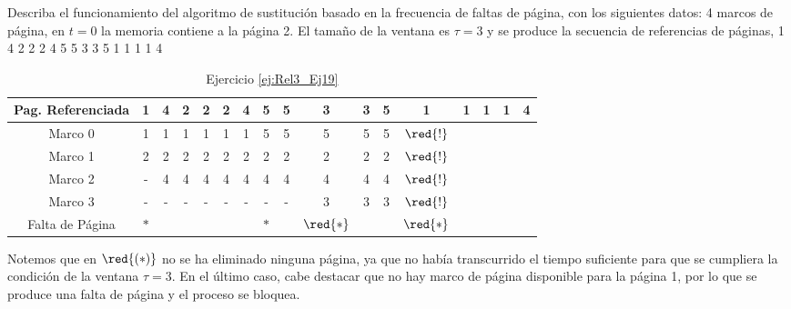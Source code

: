 \begin{ejercicio} \label{ej:Rel3_Ej19}
    Describa el funcionamiento del algoritmo de sustitución basado en la frecuencia de
faltas de página, con los siguientes datos: 4 marcos de página, en $t = 0$ la memoria
contiene a la página 2. El tamaño de la ventana es $\tau= 3$ y se produce la secuencia de
referencias de páginas, 1 4 2 2 2 4 5 5 3 3 5 1 1 1 1 4

    \begin{table}[H]
        \centering
        \begin{tabular}{|c|c|c|c|c|c|c|c|c|c|c|c|c|c|c|c|c|}
        Pag. Referenciada & 1 & 4 & 2 & 2 & 2 & 4 & 5 & 5 & 3 & 3 & 5 & 1 & 1 & 1 & 1 & 4 \\ \hline \hline
        Marco 0           & 1 & 1 & 1 & 1 & 1 & 1 & 5 & 5 & 5 & 5 & 5 & $\red{!}$ \\ \hline
        Marco 1           & 2 & 2 & 2 & 2 & 2 & 2 & 2 & 2 & 2 & 2 & 2 & $\red{!}$  \\ \hline
        Marco 2           & - & 4 & 4 & 4 & 4 & 4 & 4 & 4 & 4 & 4 & 4 & $\red{!}$  \\ \hline
        Marco 3           & - & - & - & - & - & - & - & - & 3 & 3 & 3 & $\red{!}$\\ \hline \hline
        Falta de Página   & $\ast$ &   &   &   &   &   & $\ast$ &   & $\red{\ast}$ &   &   & $\red{\ast}$
        \end{tabular}
        \caption{Ejercicio \ref{ej:Rel3_Ej19}}
        \label{tab:Rel3_Ej19}
    \end{table}

    Notemos que en $\red{(\ast)}$ no se ha eliminado ninguna página, ya que no había transcurrido el tiempo suficiente
    para que se cumpliera la condición de la ventana $\tau=3$. En el último caso,
    cabe destacar que no hay marco de página disponible para la página 1, por lo que se produce una falta de página
    y el proceso se bloquea.
\end{ejercicio}


